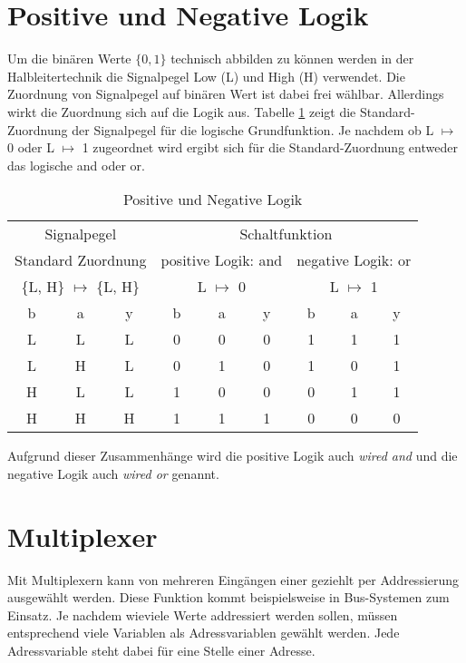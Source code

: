 \section{Positive und Negative Logik}
Um die binären Werte $\{0, 1\}$ technisch abbilden zu können werden in der Halbleitertechnik die Signalpegel Low (L) und High (H) verwendet. Die Zuordnung von Signalpegel auf binären Wert ist dabei frei wählbar. Allerdings wirkt die Zuordnung sich auf die Logik aus. Tabelle \ref{posNegLogik} zeigt die Standard-Zuordnung der Signalpegel für die logische Grundfunktion. Je nachdem ob L $\mapsto$ 0 oder L $\mapsto$ 1 zugeordnet wird ergibt sich für die Standard-Zuordnung entweder das logische {\sc and} oder {\sc or}.
\begin{table}[h]
\centering
\begin{tabular}{*{2}{cc|c||}cc|c}
\multicolumn{3}{c||}{Signalpegel} & \multicolumn{6}{c}{Schaltfunktion}\\
\multicolumn{3}{c||}{Standard Zuordnung} & \multicolumn{3}{c||}{positive Logik: {\sc and}} & \multicolumn{3}{c}{negative Logik: {\sc or}}\\
\multicolumn{3}{c||}{\{L, H\} $\mapsto$ \{L, H\}} & \multicolumn{3}{c||}{L $\mapsto$ 0} & \multicolumn{3}{c}{L $\mapsto$ 1}\\ \hline
b & a & y & b & a & y & b & a & y \\ \hline
L & L & L & 0 & 0 & 0 & 1 & 1 & 1 \\
L & H & L & 0 & 1 & 0 & 1 & 0 & 1 \\
H & L & L & 1 & 0 & 0 & 0 & 1 & 1 \\
H & H & H & 1 & 1 & 1 & 0 & 0 & 0 \\
\end{tabular}
\caption{Positive und Negative Logik}
\label{posNegLogik}
\end{table}

Aufgrund dieser Zusammenhänge wird die positive Logik auch {\sl wired {\sc and}} und die negative Logik auch {\sl wired {\sc or}} genannt.  
  
\section{Multiplexer}  
Mit Multiplexern kann von mehreren Eingängen einer geziehlt per Addressierung ausgewählt werden. Diese Funktion kommt beispielsweise in Bus-Systemen zum Einsatz. Je nachdem wieviele Werte addressiert werden sollen, müssen entsprechend viele Variablen als Adressvariablen gewählt werden. Jede Adressvariable steht dabei für eine Stelle einer Adresse. 

